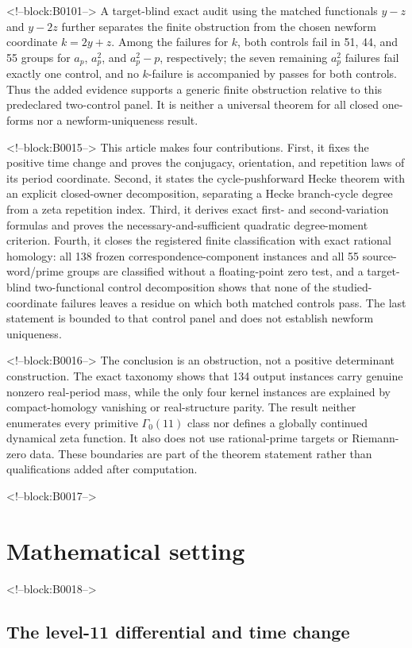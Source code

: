 \documentclass[11pt]{article}
\theoremstyle{definition}
\theoremstyle{remark}
\newcommand{\G}{\Gamma_0(11)}
\begin{document}
<!--block:B0101-->
A target-blind exact audit using the matched functionals $y-z$ and $y-2z$ further separates the finite obstruction from the chosen newform coordinate $k=2y+z$. Among the failures for $k$, both controls fail in 51, 44, and 55 groups for $a_p$, $a_p^2$, and $a_p^2-p$, respectively; the seven remaining $a_p^2$ failures fail exactly one control, and no $k$-failure is accompanied by passes for both controls. Thus the added evidence supports a generic finite obstruction relative to this predeclared two-control panel. It is neither a universal theorem for all closed one-forms nor a newform-uniqueness result.

<!--block:B0015-->
This article makes four contributions. First, it fixes the positive time change and proves the conjugacy, orientation, and repetition laws of its period coordinate. Second, it states the cycle-pushforward Hecke theorem with an explicit closed-owner decomposition, separating a Hecke branch-cycle degree from a zeta repetition index. Third, it derives exact first- and second-variation formulas and proves the necessary-and-sufficient quadratic degree-moment criterion. Fourth, it closes the registered finite classification with exact rational homology: all 138 frozen correspondence-component instances and all 55 source-word/prime groups are classified without a floating-point zero test, and a target-blind two-functional control decomposition shows that none of the studied-coordinate failures leaves a residue on which both matched controls pass. The last statement is bounded to that control panel and does not establish newform uniqueness.

<!--block:B0016-->
The conclusion is an obstruction, not a positive determinant construction. The exact taxonomy shows that 134 output instances carry genuine nonzero real-period mass, while the only four kernel instances are explained by compact-homology vanishing or real-structure parity. The result neither enumerates every primitive $\G$ class nor defines a globally continued dynamical zeta function. It also does not use rational-prime targets or Riemann-zero data. These boundaries are part of the theorem statement rather than qualifications added after computation.

<!--block:B0017-->
\section{Mathematical setting}

<!--block:B0018-->
\subsection{The level-11 differential and time change}
\end{document}
